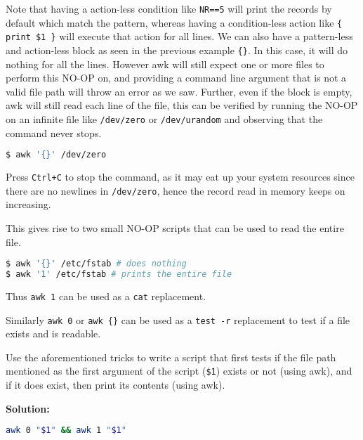 \begin{remark}
  Note that having a action-less condition like \lstinline|NR==5| will print the records by default which match the pattern, whereas having a condition-less action like \lstinline|{ print $1 }| will execute that action for all lines. We can also have a pattern-less and action-less block as seen in the previous example \lstinline|{}|. In this case, it will do nothing for all the lines. However awk will still expect one or more files to perform this NO-OP on, and providing a command line argument that is not a valid file path will throw an error as we saw. Further, even if the block is empty, awk will still read each line of the file, this can be verified by running the NO-OP on an infinite file like \lstinline|/dev/zero| or \lstinline|/dev/urandom| and observing that the command never stops.
\end{remark}

\begin{lstlisting}[language=bash]
$ awk '{}' /dev/zero
\end{lstlisting}

Press \lstinline|Ctrl+C| to stop the command, as it may eat up your system resources since there are no newlines in \lstinline|/dev/zero|, hence the record read in memory keeps on increasing.

This gives rise to two small NO-OP scripts that can be used to read the entire file.

\begin{lstlisting}[language=bash]
$ awk '{}' /etc/fstab # does nothing
$ awk '1' /etc/fstab # prints the entire file
\end{lstlisting}

Thus \lstinline|awk 1| can be used as a \lstinline|cat| replacement.

Similarly \lstinline|awk 0| or \lstinline|awk {}| can be used as a \lstinline|test -r| replacement to test if a file exists and is readable.

\begin{exercise}
  Use the aforementioned tricks to write a script that first tests if the file path mentioned as the first argument of the script (\lstinline|$1|) exists or not (using awk), and if it does exist, then print its contents (using awk).
\end{exercise}

\textbf{Solution:}

\begin{lstlisting}[language=bash]
awk 0 "$1" && awk 1 "$1"
\end{lstlisting}

